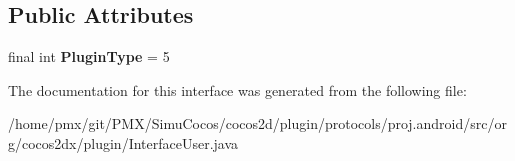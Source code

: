 \subsection*{Public Attributes}
\begin{DoxyCompactItemize}
\item 
\mbox{\label{interfaceorg_1_1cocos2dx_1_1plugin_1_1InterfaceUser_a343a99d034956db358ef3bc3202528b5}} 
final int {\bfseries Plugin\+Type} = 5
\end{DoxyCompactItemize}


The documentation for this interface was generated from the following file\+:\begin{DoxyCompactItemize}
\item 
/home/pmx/git/\+P\+M\+X/\+Simu\+Cocos/cocos2d/plugin/protocols/proj.\+android/src/org/cocos2dx/plugin/Interface\+User.\+java\end{DoxyCompactItemize}
